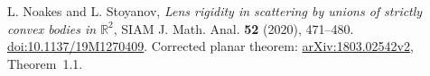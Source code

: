 L. Noakes and L. Stoyanov,
\emph{Lens rigidity in scattering by unions of strictly convex bodies
in $\mathbb R^2$},
SIAM J. Math. Anal. \textbf{52} (2020), 471--480.
\href{https://doi.org/10.1137/19M1270409}{doi:10.1137/19M1270409}.
Corrected planar theorem: \href{https://arxiv.org/abs/1803.02542v2}
{arXiv:1803.02542v2}, Theorem~1.1.
